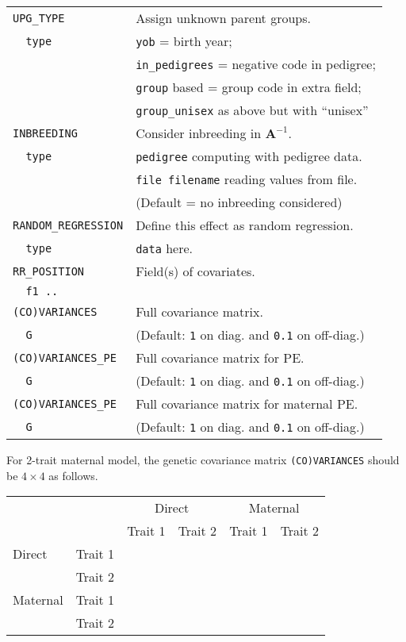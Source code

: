 \documentclass[10pt,landscape]{article}
\begin{document}
\begin{multicols}{3}
\begin{tabular}{@{}ll@{}}
  \verb|UPG_TYPE|  & Assign unknown parent groups.\\
  \verb|  type|  & \verb|yob| = birth year;\\
                & \verb|in_pedigrees| = negative code in pedigree;\\
                & \verb|group| based = group code in extra field;\\
                & \verb|group_unisex| as above but with ``unisex''\\
  \verb|INBREEDING| & Consider inbreeding in $\mathbf{A}^{-1}$.\\
  \verb|  type| & \verb|pedigree| computing with pedigree data.\\
               & \verb|file filename| reading values from file.\\
               & (Default = no inbreeding considered)\\
  \verb|RANDOM_REGRESSION| & Define this effect as random regression.\\
  \verb|  type| & \verb|data| here.\\
  \verb|RR_POSITION| & Field(s) of covariates.\\
  \verb|  f1 ..| & \\
  \verb|(CO)VARIANCES| & Full covariance matrix.\\
  \verb|  G| & (Default: \verb|1| on diag. and \verb|0.1| on off-diag.)\\
  \verb|(CO)VARIANCES_PE| & Full covariance matrix for PE.\\
  \verb|  G| & (Default: \verb|1| on diag. and \verb|0.1| on off-diag.)\\
  \verb|(CO)VARIANCES_PE| & Full covariance matrix for maternal PE.\\
  \verb|  G| & (Default: \verb|1| on diag. and \verb|0.1| on off-diag.)\\
\end{tabular}

For 2-trait maternal model, the genetic covariance matrix \verb|(CO)VARIANCES| should be $4\times 4$ as follows.

\begin{tabular}{@{}ll|c|c|c|c|@{}}
  &       &\multicolumn{2}{c}{Direct}&\multicolumn{2}{c}{Maternal}\\
\cline{3-6}
  &       &Trait 1&Trait 2&Trait 1&Trait 2\\
\hline
Direct&Trait 1& & & &\\
\hline
&Trait 2& & & &\\
\hline
Maternal&Trait 1& & & &\\
\hline
        &Trait 2& & & &\\
\hline
\end{tabular}


\end{multicols}
\end{document}
